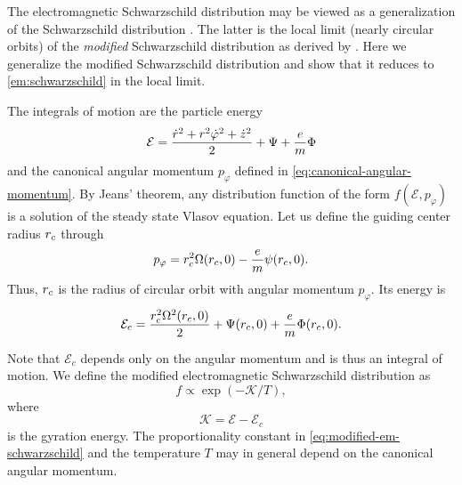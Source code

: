 \documentclass[aps,pre,notitlepage,amsmath,amssymb,amsfonts,nobibnotes,nofootinbib,superscriptaddress]{revtex4-1}
\begin{document}
The electromagnetic Schwarzschild distribution 
may be viewed as a generalization of the Schwarzschild distribution
\citep[e.g.][]{Julian1966}. The latter is the local limit (nearly circular
orbits) of the \emph{modified} Schwarzschild distribution as derived by
\citet{Shu1969}. Here we generalize the modified Schwarzschild distribution
and show that it reduces to \cref{em:schwarzschild} in the local limit.

The integrals of motion are the particle energy
\begin{equation}
  \mathcal{E} = \frac{\dot{r}^2 + r^2\dot{\varphi}^2 + \dot{z}^2}{2}
  + \Psi + \frac{e}{m}\Phi
\end{equation}
and the canonical angular momentum $p_\varphi$ defined in
\cref{eq:canonical-angular-momentum}.  By Jeans' theorem, any distribution
function of the form $f(\mathcal{E},p_\varphi)$ is a solution of the steady
state Vlasov equation. Let us define the guiding center radius $r_c$ through
\begin{equation}
  p_\varphi = r_c^2\Omega(r_c,0) - \frac{e}{m}\psi(r_c,0).
\end{equation}
Thus, $r_c$ is the radius of circular orbit with angular momentum $p_\varphi$.
Its energy is
\begin{equation}
  \mathcal{E}_c = \frac{r_c^2\Omega^2(r_c,0)}{2}
  + \Psi(r_c,0) + \frac{e}{m}\Phi(r_c,0).
\end{equation}

Note that $\mathcal{E}_c$ depends only on the angular momentum and is thus an
integral of motion. We define the modified electromagnetic Schwarzschild
distribution as
\begin{equation}
  \label{eq:modified-em-schwarzschild}
  f \propto \exp(-\mathcal{K}/T),
\end{equation}
where
\begin{equation}
  \label{eq:global-gyration-energy}
  \mathcal{K} = \mathcal{E} - \mathcal{E}_c
\end{equation}
is the gyration energy. The proportionality constant in
\cref{eq:modified-em-schwarzschild} and the temperature $T$ may in general
depend on the canonical angular momentum.
\end{document}
